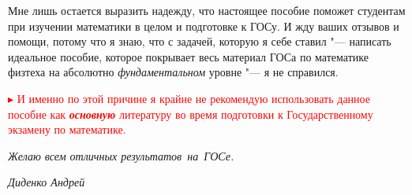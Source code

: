 Мне лишь остается выразить надежду, что настоящее пособие поможет студентам при изучении математики в целом и подготовке к ГОСу. И жду ваших отзывов и помощи, потому что я знаю, что с задачей, которую я себе ставил "--- написать идеальное пособие, которое покрывает весь материал ГОСа по математике физтеха на абсолютно \textit{фундаментальном} уровне "--- я не справился.

\textcolor{red}{
$\blacktriangleright$
И именно по этой причине я крайне не рекомендую использовать данное пособие как \textit{\textbf{основную}} литературу во время подготовки к Государственному экзамену по математике.
}

\vspace*{0.7\baselineskip} 

\textit{Желаю всем отличных результатов~на~ГОСе.}

\mbox{}

\noindent\textit{Диденко Андрей}